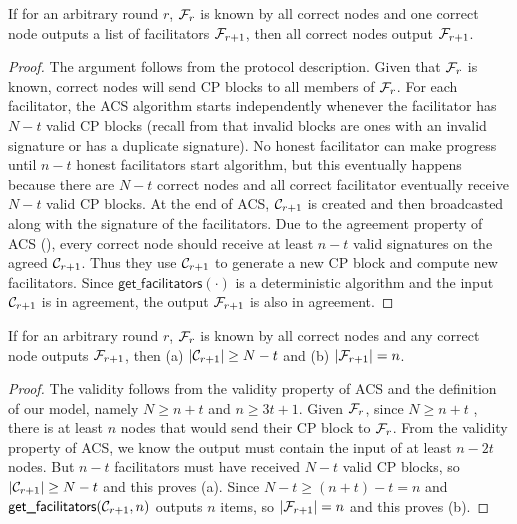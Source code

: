 \begin{lemma}
\label{lemma:agreement}
If for an arbitrary round $r$,
$\mathcal{F}_{r}$ is known by all correct nodes and one correct node outputs a list of facilitators $\mathcal{F}_{r+1}$,
then all correct nodes output $\mathcal{F}_{r+1}$.
\end{lemma}
\begin{proof}
The argument follows from the protocol description.
Given that $\mathcal{F}_r$ is known,
correct nodes will send CP blocks to all members of $\mathcal{F}_r$.
For each facilitator, the ACS algorithm starts independently whenever the facilitator has $N - t$ valid CP blocks
(recall from  that invalid blocks are ones with an invalid signature or has a duplicate signature).
No honest facilitator can make progress until $n-t$ honest facilitators start algorithm,
but this eventually happens because there are $N - t$ correct nodes and all correct facilitator eventually receive $N -t$ valid CP blocks.
At the end of ACS, $\mathcal{C}_{r+1}$ is created and then broadcasted along with the signature of the facilitators.
Due to the agreement property of ACS (),
every correct node should receive at least $n - t$ valid signatures on the agreed $\mathcal{C}_{r+1}$.
Thus they use $\mathcal{C}_{r+1}$ to generate a new CP block and compute new facilitators.
Since $\textsf{get\_facilitators}(\cdot)$ is a deterministic algorithm and the input $\mathcal{C}_{r+1}$ is in agreement, the output $\mathcal{F}_{r+1}$ is also in agreement.
\end{proof}

\begin{lemma}
\label{lemma:validity}
If for an arbitrary round $r$,
$\mathcal{F}_r$ is known by all correct nodes and any correct node outputs $\mathcal{F}_{r+1}$,
then (a) $|\mathcal{C}_{r+1}| \ge N - t$ and (b) $|\mathcal{F}_{r+1}| = n$.
\end{lemma}
\begin{proof}
The validity follows from the validity property of ACS and the definition of our model,
namely $N \ge n + t$ and $n \ge 3t + 1$.
Given $\mathcal{F}_r$, since $N \ge n + t$ , there is at least $n$ nodes that would send their CP block to $\mathcal{F}_r$.
From the validity property of ACS, we know the output must contain the input of at least $n - 2t$ nodes.
But $n -t$ facilitators must have received $N - t$ valid CP blocks, so $|\mathcal{C}_{r+1}| \ge N-t$ and this proves (a).
Since $N-t \ge (n+t) -t = n$ and $\textsf{get\_facilitators}(\mathcal{C}_{r+1}, n)$ outputs $n$ items, so $|\mathcal{F}_{r+1}| = n$ and this proves (b).
\end{proof}

